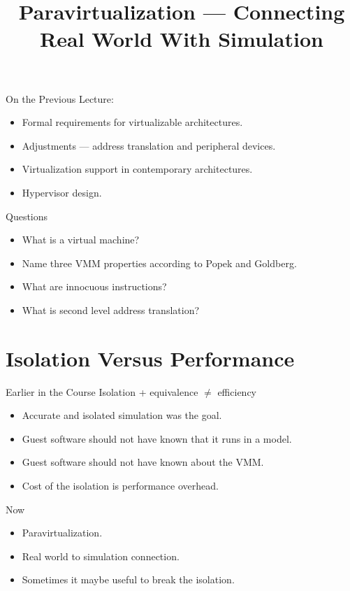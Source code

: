 
\title{Paravirtualization --- Connecting Real World With Simulation}



\startslides

\begin{frame}{On the Previous Lecture:}
  \begin{itemize}
    \item Formal requirements for virtualizable architectures.
    \item Adjustments --- address translation and peripheral devices.
    \item Virtualization support in contemporary architectures.
    \item Hypervisor design.
  \end{itemize}
\end{frame}

\begin{frame}{Questions}
  \begin{itemize}
    \item What is a virtual machine?\pause
    \item Name three VMM properties according to Popek and Goldberg.\pause
    \item What are innocuous instructions?\pause
    \item What is second level address translation?
  \end{itemize}
\end{frame}

\section{Isolation Versus Performance}

\begin{frame}{Earlier in the Course}
  Isolation + equivalence $\neq$ efficiency
  \begin{itemize}
    \item Accurate and isolated simulation was the goal.
    \item Guest software should not have known that it runs in a model.
    \item Guest software should not have known about the VMM.
    \item Cost of the isolation is performance overhead.
  \end{itemize}
\end{frame}

\begin{frame}{Now}
  \begin{itemize}
    \item Paravirtualization.
    \item Real world to simulation connection.
    \item Sometimes it maybe useful to break the isolation.
  \end{itemize}
\end{frame}

